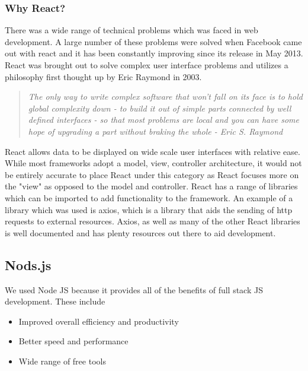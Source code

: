 \subsubsection{Why React?}
There was a wide range of technical problems which was faced in web development. \cite{IntroductionReact}A large number of these problems were solved when Facebook came out with react and it has been constantly improving since its release in May 2013. React was brought out to solve complex user interface problems and utilizes a philosophy first thought up by Eric Raymond in 2003.

\begin{quote}
\cite{ArtOfUnix}\emph{The only way to write complex software that won't fall on its face is to hold global complexity down - to build it out of simple parts connected by well defined interfaces - so that most problems are local and you can have some hope of upgrading a part without braking the whole - Eric S. Raymond}
\end{quote}

\cite{IntroductionReact}React allows data to be displayed on wide scale user interfaces with relative ease. While most frameworks adopt a model, view, controller architecture, it would not be entirely accurate to place React under this category as React focuses more on the "view" as opposed to the model and controller. \newline
React has a range of libraries which can be imported to add functionality to the framework.\cite{Axios} An example of a library which was used is axios, which is a library that aids the sending of http requests to external resources. Axios, as well as many of the other React libraries is well documented and has plenty resources out there to aid development.

\subsection{Nods.js}
We used Node JS because it provides all of the benefits of \cite{fullStackJS}full stack JS development. These include

\begin{itemize}
    \item Improved overall efficiency and productivity
    \item Better speed and performance
    \item Wide range of free tools
\end{itemize}

